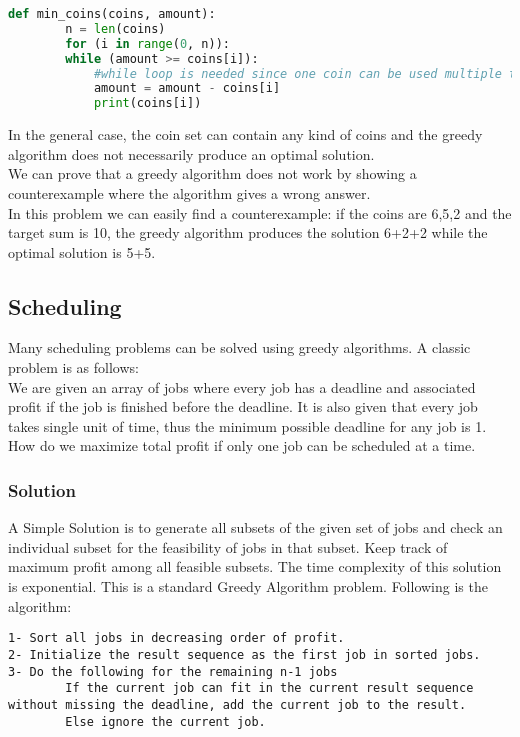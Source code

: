 \documentclass[12pt]{article}
\begin{document}
	\begin{lstlisting}[language=Python]
	def min_coins(coins, amount):
	    n = len(coins)
        for (i in range(0, n)):
        while (amount >= coins[i]):
            #while loop is needed since one coin can be used multiple times
            amount = amount - coins[i]
            print(coins[i])

    \end{lstlisting}
    In the general case, the coin set can contain any kind of coins and the greedy algorithm does not necessarily produce an optimal solution.\\
    We can prove that a greedy algorithm does not work by showing a counterexample where the algorithm gives a wrong answer.\\
    In this problem we can easily find a counterexample: if the coins are {6,5,2} and the target sum is 10, the greedy algorithm produces the solution 6+2+2 while the optimal solution is 5+5.
    \subsection{Scheduling}
    Many scheduling problems can be solved using greedy algorithms. A classic problem is as follows:\\
    We are given an array of jobs where every job has a deadline and associated profit if the job is finished before the deadline. It is also given that every job takes single unit of time, thus the minimum possible deadline for any job is 1. How do we maximize total profit if only one job can be scheduled at a time.
    \subsubsection{Solution}
    A Simple Solution is to generate all subsets of the given set of jobs and check an individual subset for the feasibility of jobs in that subset. Keep track of maximum profit among all feasible subsets. The time complexity of this solution is exponential.
    This is a standard Greedy Algorithm problem. Following is the algorithm:
	\begin{lstlisting}[numbers=none, frame=none]
1- Sort all jobs in decreasing order of profit.
2- Initialize the result sequence as the first job in sorted jobs.
3- Do the following for the remaining n-1 jobs
        If the current job can fit in the current result sequence without missing the deadline, add the current job to the result.
        Else ignore the current job.
	\end{lstlisting}
	
\end{document}
